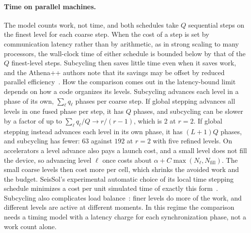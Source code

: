 \documentclass[12pt]{article}
\theoremstyle{remark}
\begin{document}
\paragraph{Time on parallel machines.}
The model counts work, not time, and both schedules take $Q$ sequential steps on the finest level for each coarse step. When the cost of a step is set by communication latency rather than by arithmetic, as in strong scaling to many processors, the wall-clock time of either schedule is bounded below by that of the $Q$ finest-level steps. Subcycling then saves little time even when it saves work, and the Athena++ authors note that its savings may be offset by reduced parallel efficiency~\cite{stone2020athena}. How the comparison comes out in the latency-bound limit depends on how a code organizes its levels. Subcycling advances each level in a phase of its own, $\sum_\ell q_\ell$ phases per coarse step. If global stepping advances all levels in one fused phase per step, it has $Q$ phases, and subcycling can be slower by a factor of up to $\sum_\ell q_\ell/Q\to r/(r-1)$, which is 2 at $r=2$. If global stepping instead advances each level in its own phase, it has $(L+1)Q$ phases, and subcycling has fewer: $63$ against $192$ at $r=2$ with five refined levels. On accelerators a level advance also pays a launch cost, and a small level does not fill the device, so advancing level $\ell$ once costs about $\alpha+C\max(N_\ell,N_{\mathrm{fill}})$. The small coarse levels then cost more per cell, which shrinks the avoided work and the budget. SeisSol's experimental automatic choice of its local time stepping schedule minimizes a cost per unit simulated time of exactly this form~\cite{seissol2026local}. Subcycling also complicates load balance~\cite{dubey2014survey,stone2020athena,schive2018gamer}: finer levels do more of the work, and different levels are active at different moments. In this regime the comparison needs a timing model with a latency charge for each synchronization phase, not a work count alone.
\end{document}
